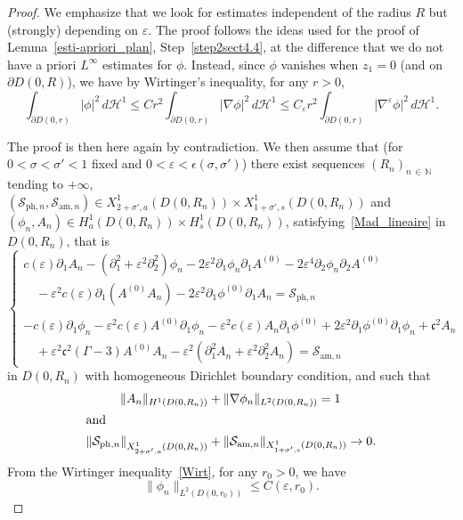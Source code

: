 \documentclass[10pt]{amsart}
\theoremstyle{definition}\newtheorem{defi}[theo]{Definition}\newtheorem{rema}[theo]{Remark}\newtheorem{exam}[theo]{Example}\newtheorem{exem}[theo]{Example}\newtheorem{nota}[theo]{Notation}
\newcommand*\p{\partial}
\newcommand*\N{\mathbb N}
\newcommand{\amm}{\mathrm{am}}
\newcommand{\phl}{\mathrm{ph}}
\newcommand*\BH{\mathcal{H}}
\newcommand*\BS{\mathcal{S}}
\newcommand*\cs{{\mathfrak c}}
\newcommand*\ii{\infty}
\newcommand*\ls{\leqslant }
\newcommand*\e{\varepsilon}
\newcommand*\ep{\epsilon}
\newcommand*\s{\sigma}
\begin{document}
\begin{proof}
We emphasize that we look for estimates independent of the radius $ R $ but (strongly) depending on $ \e $. The proof follows the ideas used for the proof of Lemma~\ref{esti-apriori_plan}, Step~\ref{step2sect4.4}, at the difference that we do not have a priori $ L^\ii $ estimates for $ \phi $. Instead, since $ \phi $ vanishes when $ z_1 = 0 $ (and on $ \p D(0, R) $), we have by Wirtinger's inequality, for any $ r > 0 $,
\begin{equation}\label{Wirt}
\int_{ \p D(0,r) } \lvert \phi \rvert^2 \, d \BH^1
\ls C r^2 \int_{ \p D(0,r) } \lvert \nabla \phi \rvert^2 \, d \BH^1
\ls C_\e r^2 \int_{ \p D(0,r) } \lvert \nabla^\e \phi \rvert^2 \, d \BH^1.
\end{equation}

The proof is then here again by contradiction. We then assume that (for $ 0 < \s < \s' <1 $ fixed and $ 0 < \e < \ep(\s, \s') $) there exist sequences $ (R_n)_{n\,\in\,\N} $ tending to $ + \ii $, $ (\BS_{{\phl},n}, \BS_{{\amm},n}) \in X^1_{2+\s',a} (D(0,R_n)) \times X^1_{1+ \s',s } (D(0,R_n)) $ and $ (\phi_n, A_n) \in H^1_{a } (D(0,R_n)) \times H^1_{s } (D(0,R_n))$, satisfying~\eqref{Mad_lineaire} in $ D(0,R_n)$, that is
\begin{equation}\label{syst_abs_disk}
\left\{
\begin{array}{ll}
c(\e) \p_{1} A_n - \left(\p_{1}^2 + \e^2 \p^2_{2}\right) \phi_n - 2 \e^2 \p_{1} \phi_n \p_{1} A^{(0)} - 2 \e^4 \p_{2} \phi_n \p_{2} A^{(0)}
\\
\quad - \e^2 c(\e) \p_1 \left(A^{(0)} A_n\right) - 2 \e^2 \p_{1} \phi^{(0)} \p_{1} A_n = \BS_{{\phl},n} \\ \ \\
- c(\e) \p_{1} \phi_n - \e^2 c(\e) A^{(0)} \p_1 \phi_n - \e^2 c(\e) A_n \p_1 \phi^{(0)} + 2 \e^2 \p_{1} \phi^{(0)} \p_{1} \phi_n + \cs^2 A_n
\\
\quad + \e^2 \cs^2 (\Gamma -3) A^{(0)} A_n - \e^2 \left(\p_{1}^2 A_n + \e^2 \p_{2}^2 A_n\right) = \BS_{{\amm},n}
\end{array}\right.
\end{equation}
in $ D(0,R_n) $ with homogeneous Dirichlet boundary condition, and such that
\begin{align}
\| A_n \|_{ H^1 (D(0,R_n))} &+ \| \nabla \phi_n \|_{ L^2 (D(0,R_n))} = 1\label{hypoth1_disk}
\\
\intertext{and}
\left\| \BS_{{\phl},n} \right\|_{ X^1_{2+\s', a} (D(0,R_n))} &+ \| \BS_{{\amm},n} \|_{ X^1_{1+\s', s} (D(0,R_n))}
\to 0.\label{hypoth2_disk}
\end{align}
From the Wirtinger inequality~\eqref{Wirt}, for any $ r_0 > 0 $, we have
\[
\| \phi_n \|_{L^2 (D(0,r_0))} \ls C (\e, r_0).
\]


\end{proof}
\end{document}
